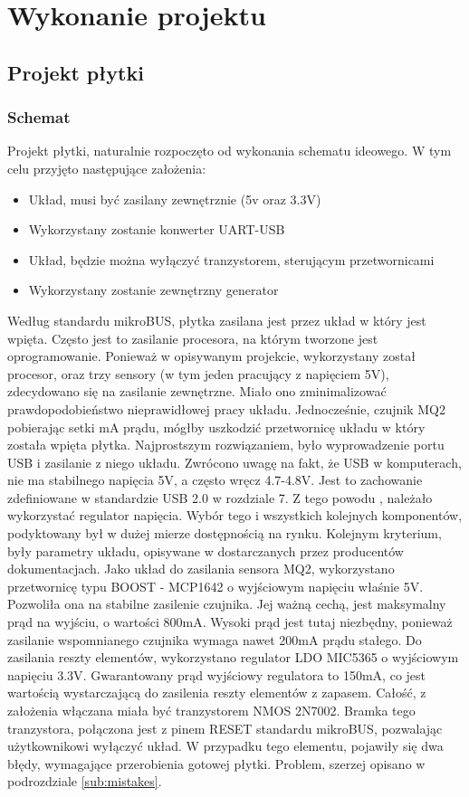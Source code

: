 \chapter{Wykonanie projektu}
\label{cha:course}

\section{Projekt płytki}
\subsection{Schemat}
Projekt płytki, naturalnie rozpoczęto od wykonania schematu ideowego. W tym celu przyjęto następujące założenia:
\begin{itemize}
    \item Układ, musi być zasilany zewnętrznie (5v oraz 3.3V)
    \item Wykorzystany zostanie konwerter UART-USB
    \item Układ, będzie można wyłączyć tranzystorem, sterującym przetwornicami
    \item Wykorzystany zostanie zewnętrzny generator
\end{itemize}
Według standardu mikroBUS\texttrademark, płytka zasilana jest przez układ w który jest wpięta. Często jest to zasilanie procesora, na którym tworzone jest oprogramowanie. Ponieważ w opisywanym projekcie, wykorzystany został procesor, oraz trzy sensory (w tym jeden pracujący z napięciem 5V), zdecydowano się na zasilanie zewnętrzne. Miało ono zminimalizować prawdopodobieństwo nieprawidłowej pracy układu. Jednocześnie, czujnik MQ2 pobierając setki mA prądu, mógłby uszkodzić przetwornicę układu w który została wpięta płytka. Najprostszym rozwiązaniem, było wyprowadzenie portu USB i zasilanie z niego układu. Zwrócono uwagę na fakt, że USB w komputerach, nie ma stabilnego napięcia 5V, a często wręcz 4.7-4.8V. Jest to zachowanie zdefiniowane w standardzie USB 2.0 \cite{usb_specification} w rozdziale 7. Z tego powodu , należało wykorzystać regulator napięcia. \newline Wybór tego i wszystkich kolejnych komponentów, podyktowany był w dużej mierze dostępnością na rynku. Kolejnym kryterium, były parametry układu, opisywane w dostarczanych przez producentów dokumentacjach. Jako układ do zasilania sensora MQ2, wykorzystano przetwornicę typu BOOST - MCP1642 o wyjściowym napięciu właśnie 5V. Pozwoliła ona na stabilne zasilenie czujnika. Jej ważną cechą, jest maksymalny prąd na wyjściu, o wartości 800mA\cite{mq2_datasheet}. Wysoki prąd jest tutaj niezbędny, ponieważ zasilanie wspomnianego czujnika wymaga nawet 200mA prądu stałego. Do zasilania reszty elementów, wykorzystano regulator LDO  MIC5365 o wyjściowym napięciu 3.3V\cite{mic_datasheet}. Gwarantowany prąd wyjściowy regulatora to 150mA, co jest wartością wystarczającą do zasilenia reszty elementów z zapasem. Całość, z założenia włączana miała być tranzystorem NMOS 2N7002. Bramka tego tranzystora, połączona jest z pinem RESET standardu mikroBUS\texttrademark, pozwalając użytkownikowi wyłączyć układ. W przypadku tego elementu, pojawiły się dwa błędy, wymagające przerobienia gotowej płytki. Problem, szerzej opisano w podrozdziale \ref{sub:mistakes}. \newline
